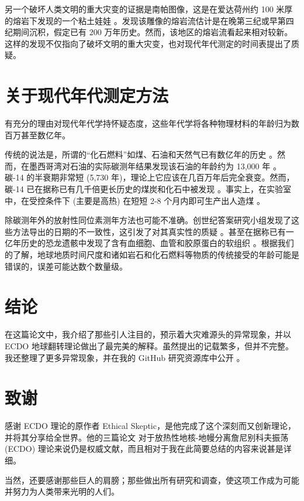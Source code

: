 \documentclass[10pt,twocolumn,letterpaper]{article}
\begin{document}
另一个破坏人类文明的重大灾变的证据是南帕图像，这是在爱达荷州约 100 米厚的熔岩下发现的一个粘土娃娃 \cite{102,103}。发现该雕像的熔岩流估计是在晚第三纪或早第四纪期间沉积，假定已有 200 万年历史。然而，该地区的熔岩流看起来相对较新。这样的发现不仅指向了破坏文明的重大灾变，也对现代年代测定的时间表提出了质疑。

\section{关于现代年代测定方法}

有充分的理由对现代年代学持怀疑态度，这些年代学将各种物理材料的年龄归为数百万甚至数亿年。

传统的说法是，所谓的“化石燃料”如煤、石油和天然气已有数亿年的历史 \cite{104}。然而，在墨西哥湾对石油的实际碳测年结果发现该石油的年龄约为 13,000 年 \cite{105}。碳-14 的半衰期非常短 (5,730 年)，理论上它应该在几百万年后完全衰变。然而，碳-14 已在据称已有几千倍更长历史的煤炭和化石中被发现 \cite{106}。事实上，在实验室中，在受控条件下 (主要是高热) 在短短 2-8 个月内即可生产出人造煤 \cite{107}。

除碳测年外的放射性同位素测年方法也可能不准确。创世纪答案研究小组发现了这些方法导出的日期的不一致性，这引发了对其真实性的质疑 \cite{108}。甚至在据称已有一亿年历史的恐龙遗骸中发现了含有血细胞、血管和胶原蛋白的软组织 \cite{109,110}。根据我们的了解，地球地质时间尺度和诸如岩石和化石燃料等物质的传统接受的年龄可能是错误的，误差可能达数个数量级。

\section{结论}

在这篇论文中，我介绍了那些引人注目的，预示着大灾难源头的异常现象，并以 ECDO 地球翻转理论做出了最完美的解释。虽然提出的记载繁多，但并不完整。我还整理了更多异常现象，并在我的 GitHub 研究资源库中公开 \cite{2}。

\section{致谢}

感谢 ECDO 理论的原作者 Ethical Skeptic，是他完成了这个深刻而又创新理论，并将其分享给全世界。他的三篇论文 \cite{1} 对于放热性地核-地幔分离詹尼别科夫振荡 (ECDO) 理论来说仍是权威文献，而且相对于我在此简要总结的内容来说甚是详细。

当然，还要感谢那些巨人的肩膀；那些做出所有研究和调查，使这项工作成为可能并努力为人类带来光明的人们。

{\small


}
\end{document}
